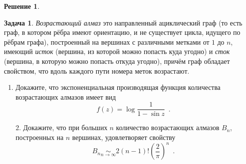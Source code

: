 \documentclass[a5paper]{article}
\theoremstyle{definition}
\newtheorem{problem}{Задача}
\newtheorem*{solution}{Решение}
\begin{document}
\begin{solution}
\end{solution}

\noindent\begin{minipage}{0.6\textwidth}
\begin{problem}
\emph{Возрастающий алмаз} это
направленный ациклический граф (то есть граф, в котором рёбра имеют ориентацию, и
не существует цикла, идущего по рёбрам графа),
построенный на вершинах с различными метками от \( 1 \) до \( n \), имеющий
\textit{исток} (вершина, из которой можно попасть куда угодно) и \textit{сток}
(вершина, в которую можно попасть откуда угодно), причём граф обладает
свойством, что вдоль каждого пути номера меток возрастают.
\begin{enumerate}
\item Докажите, что экспоненциальная производящая функция количества
возрастающих алмазов имеет вид
\begin{equation}
    f(z) = \log \dfrac{1}{1 - \sin z}
    \enspace .
\end{equation}
\end{enumerate}
\end{problem}%
\end{minipage}%
\hfill%
\begin{minipage}{0.3\textwidth}\raggedleft
{}
\end{minipage}
\begin{enumerate}
\item[2.] 
Докажите, что при больших \( n \)
количество возрастающих алмазов \( B_n \), построенных на \( n \) вершинах,
удовлетворяет свойству
\begin{equation}
    B_n \underset{n \to \infty}{\sim} 2 (n-1)! \left( \frac{2}{\pi} \right)^n
    \enspace .
\end{equation}
\end{enumerate}
\end{document}
